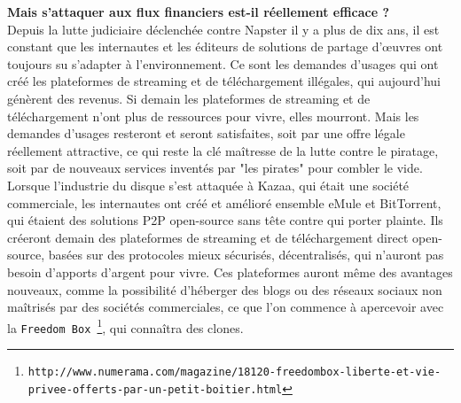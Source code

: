 \documentclass[11pt,twoside,a4paper]{article}
\begin{document}
\textbf{Mais s'attaquer aux flux financiers est-il r{\'e}ellement efficace ?} ~\\

Depuis la lutte judiciaire d{\'e}clench{\'e}e contre Napster il y a plus de dix ans, il est constant que les internautes et les {\'e}diteurs de solutions de partage d'\oe uvres ont toujours su s'adapter {\`a} l'environnement. Ce sont les demandes d'usages qui ont cr{\'e}{\'e} les plateformes de streaming et de t{\'e}l{\'e}chargement ill{\'e}gales, qui aujourd'hui g{\'e}n{\`e}rent des revenus. Si demain les plateformes de streaming et de t{\'e}l{\'e}chargement n'ont plus de ressources pour vivre, elles mourront. Mais les demandes d'usages resteront et seront satisfaites, soit par une offre l{\'e}gale r{\'e}ellement attractive, ce qui reste la cl{\'e} ma{\^i}tresse de la lutte contre le piratage, soit par de nouveaux services invent{\'e}s par "les pirates" pour combler le vide. ~\\

Lorsque l'industrie du disque s'est attaqu{\'e}e {\`a} Kazaa, qui {\'e}tait une soci{\'e}t{\'e} commerciale, les internautes ont cr{\'e}{\'e} et am{\'e}lior{\'e} ensemble eMule et BitTorrent, qui {\'e}taient des solutions P2P open-source sans t{\^e}te contre qui porter plainte. Ils cr{\'e}eront demain des plateformes de streaming et de t{\'e}l{\'e}chargement direct open-source, bas{\'e}es sur des protocoles mieux s{\'e}curis{\'e}s, d{\'e}centralis{\'e}s, qui n'auront pas besoin d'apports d'argent pour vivre. Ces plateformes auront m{\^e}me des avantages nouveaux, comme la possibilit{\'e} d'h{\'e}berger des blogs ou des r{\'e}seaux sociaux non ma{\^i}tris{\'e}s par des soci{\'e}t{\'e}s commerciales, ce que l'on commence {\`a} apercevoir avec la \texttt{Freedom Box~\footnote{\texttt{http://www.numerama.com/magazine/18120-freedombox-liberte-et-vie-privee-offerts-par-un-petit-boitier.html}}}, qui conna{\^i}tra des clones. ~\\
\end{document}
